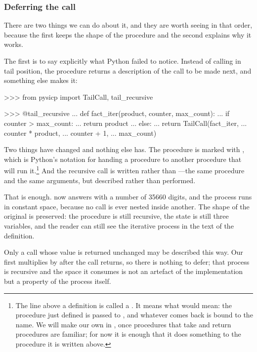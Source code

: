 \subsubsection*{Deferring the call}

There are two things we can do about it, and they are worth seeing in that
order, because the first keeps the shape of the procedure and the second
explains why it works.

The first is to say explicitly what Python failed to notice.  Instead of
calling  in tail position, the procedure returns a description
of the call to be made next, and something else makes it:

\begin{codeBlock}
>>> from pysicp import TailCall, tail_recursive

>>> @tail_recursive
... def fact_iter(product, counter, max_count):
...     if counter > max_count:
...         return product
...     else:
...         return TailCall(fact_iter,
...                         counter * product,
...                         counter + 1,
...                         max_count)
\end{codeBlock}

\noindent
Two things have changed and nothing else has.  The procedure is marked with
, which is Python's notation for handing a procedure to
another procedure that will run it.\footnote{The line 
above a definition is called a .  It means what
 would mean: the procedure just
defined is passed to , and whatever comes back is bound to
the name.  We will make our own in , once procedures that take
and return procedures are familiar; for now it is enough that it does
something to the procedure it is written above.} And the recursive call is
written  rather than
---the same procedure and the same arguments, but
described rather than performed.

That is enough.   now answers with a number of 35660
digits, and the process runs in constant space, because no call is ever nested
inside another.  The shape of the original is preserved: the procedure is still
recursive, the state is still three variables, and the reader can still see the
iterative process in the text of the definition.

Only a call whose value is returned unchanged may be described this way.  Our
first  multiplies by  after the call returns, so there
is nothing to defer; that process is recursive and the space it consumes is not
an artefact of the implementation but a property of the process itself.

